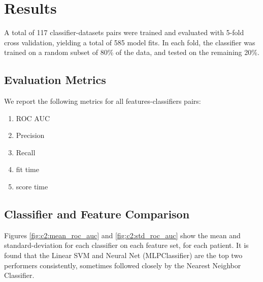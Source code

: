 \section{Results}
A total of 117 classifier-datasets pairs were trained and evaluated with 5-fold cross validation, yielding a total of 585 model fits. In each fold, the classifier was trained on a random subset of 80\% of the data, and tested on the remaining 20\%.


\subsection{Evaluation Metrics}
We report the following metrics for all features-classifiers pairs:
\begin{enumerate}
    \item ROC AUC
    \item Precision
    \item Recall
    \item fit time
    \item score time
\end{enumerate} 


\subsection{Classifier and Feature Comparison}
Figures \ref{fig:c2:mean_roc_auc} and \ref{fig:c2:std_roc_auc} show the mean and standard-deviation for each classifier on each feature set, for each patient. It is found that the Linear SVM and Neural Net (MLPClassifier) are the top two performers consistently, sometimes followed closely by the Nearest Neighbor Classifier.


